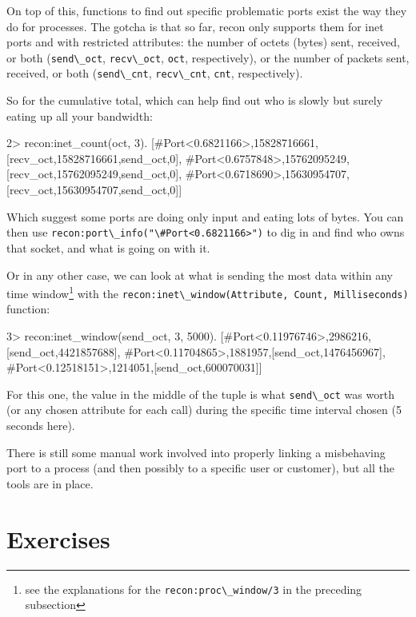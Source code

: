 \documentclass[11pt, oneside]{book}   	%
\newcommand{\function}[1]{\Verb`#1`}
\newcommand{\expression}[1]{\Verb`#1`}
\begin{document}
On top of this, functions to find out specific problematic ports exist the way they do for processes. The gotcha is that so far, recon only supports them for inet ports and with restricted attributes: the number of octets (bytes) sent, received, or both (\expression{send\_oct}, \expression{recv\_oct}, \expression{oct}, respectively), or the number of packets sent, received, or both (\expression{send\_cnt}, \expression{recv\_cnt}, \expression{cnt}, respectively).

So for the cumulative total, which can help find out who is slowly but surely eating up all your bandwidth:

\begin{VerbatimEshell}
2> recon:inet_count(oct, 3).
[{#Port<0.6821166>,15828716661,
  [{recv_oct,15828716661},{send_oct,0}]},
 {#Port<0.6757848>,15762095249,
  [{recv_oct,15762095249},{send_oct,0}]},
 {#Port<0.6718690>,15630954707,
  [{recv_oct,15630954707},{send_oct,0}]}]
\end{VerbatimEshell}

Which suggest some ports are doing only input and eating lots of bytes. You can then use \function{recon:port\_info("\#Port<0.6821166>")} to dig in and find who owns that socket, and what is going on with it.

Or in any other case, we can look at what is sending the most data within any time window\footnote{see the explanations for the \function{recon:proc\_window/3} in the preceding subsection} with the \function{recon:inet\_window(Attribute, Count, Milliseconds)} function:

\begin{VerbatimEshell}
3> recon:inet_window(send_oct, 3, 5000).
[{#Port<0.11976746>,2986216,[{send_oct,4421857688}]},
 {#Port<0.11704865>,1881957,[{send_oct,1476456967}]},
 {#Port<0.12518151>,1214051,[{send_oct,600070031}]}]
\end{VerbatimEshell}

For this one, the value in the middle of the tuple is what \expression{send\_oct} was worth (or any chosen attribute for each call) during the specific time interval chosen (5 seconds here).

There is still some manual work involved into properly linking a misbehaving port to a process (and then possibly to a specific user or customer), but all the tools are in place. 


\section{Exercises}
\end{document}
